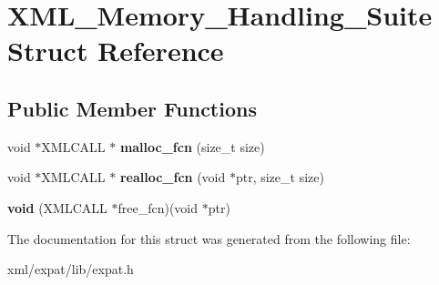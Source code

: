 \hypertarget{struct_x_m_l___memory___handling___suite}{\section{X\-M\-L\-\_\-\-Memory\-\_\-\-Handling\-\_\-\-Suite Struct Reference}
\label{struct_x_m_l___memory___handling___suite}
}
\subsection*{Public Member Functions}
\begin{DoxyCompactItemize}
\item 
\hypertarget{struct_x_m_l___memory___handling___suite_a624ea6a2b074e9c264c72ba7cb6365f9}{void $\ast$X\-M\-L\-C\-A\-L\-L $\ast$ {\bfseries malloc\-\_\-fcn} (size\-\_\-t size)}\label{struct_x_m_l___memory___handling___suite_a624ea6a2b074e9c264c72ba7cb6365f9}

\item 
\hypertarget{struct_x_m_l___memory___handling___suite_a5e176c46a6f32fc0305a43eb32304ec9}{void $\ast$X\-M\-L\-C\-A\-L\-L $\ast$ {\bfseries realloc\-\_\-fcn} (void $\ast$ptr, size\-\_\-t size)}\label{struct_x_m_l___memory___handling___suite_a5e176c46a6f32fc0305a43eb32304ec9}

\item 
\hypertarget{struct_x_m_l___memory___handling___suite_ab64237acb4611bfb6a7b33ba21de2c9d}{{\bfseries void} (X\-M\-L\-C\-A\-L\-L $\ast$free\-\_\-fcn)(void $\ast$ptr)}\label{struct_x_m_l___memory___handling___suite_ab64237acb4611bfb6a7b33ba21de2c9d}

\end{DoxyCompactItemize}


The documentation for this struct was generated from the following file\-:\begin{DoxyCompactItemize}
\item 
xml/expat/lib/expat.\-h\end{DoxyCompactItemize}
